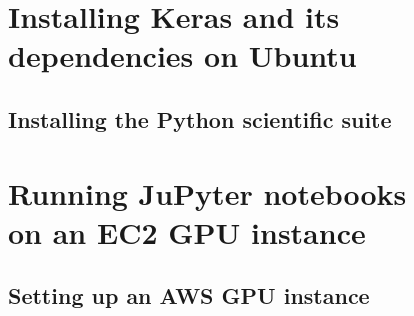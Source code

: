 \documentclass[a4paper,twoside,openany]{book}
\begin{document}
  	\pagestyle{AppendixChapStyle}
	
	\chapter*{Installing Keras and its \\ dependencies on Ubuntu} 
	\kant[1-4]
	\section{Installing the Python scientific suite}
	\kant[1-6]
	
	\chapter*{Running JuPyter notebooks \\ on an EC2 GPU instance} 
	\kant[1-4]
	\section{Setting up an AWS GPU instance}
	\kant[1-6]
	
	
	\backmatter 
	
	
	\pagestyle{IndexPagesStyle}
	
	\printindex
\end{document}
